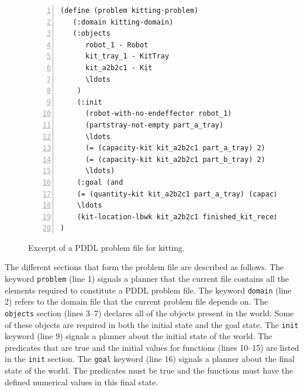 \begin{figure}[t!h!]
\begin{minipage}{.7\paperwidth}
\begin{list}{}{\setlength{\leftmargin}{1em}}\item\small
\begin{Verbatim}[commandchars=\\\{\},fontsize=\scriptsize, numbers=left, numbersep=2pt]
(define (problem kitting-problem)
   (:domain kitting-domain)
   (:objects
      robot_1 - Robot
      kit_tray_1 - KitTray
      kit_a2b2c1 - Kit
      \ldots
	)
    (:init
      (robot-with-no-endeffector robot_1)
      (partstray-not-empty part_a_tray)
      \ldots
      (= (capacity-kit kit_a2b2c1 part_a_tray) 2)
      (= (capacity-kit kit_a2b2c1 part_b_tray) 2)
      \ldots)
    (:goal (and
    (= (quantity-kit kit_a2b2c1 part_a_tray) (capacity-kit kit_a2b2c1 part_a_tray))
    \ldots
    (kit-location-lbwk kit_a2b2c1 finished_kit_receiver))
)
\end{Verbatim}
\end{list}
\end{minipage}
\caption{Excerpt of a PDDL problem file for kitting.}
\label{fig:problem}
\end{figure}

The different sections that form the problem file are described as follows. The keyword
\texttt{problem} (line 1) signals a planner that the current file contains all the elements
required to constitute a PDDL problem file. The keyword \texttt{domain} (line 2) refers to
the domain file that the current problem file depends on. The \texttt{objects} section (lines 3--7)
declares all of the objects present in the world. Some of these objects are required in both the
initial state and the goal state. The \texttt{init} keyword (line 9) signals a planner about
the initial state of the world. The predicates that are true and the initial values for
functions (lines 10--15) are listed in the \texttt{init} section. The \texttt{goal} keyword
(line 16) signals a planner about the final state of the world. The predicates must be true
and the functions must have the defined numerical values in this final state.


